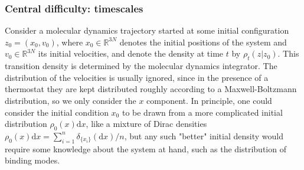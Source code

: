 \documentclass[9pt,bestpractices]{livecoms}
\begin{document}
%
%
%


\subsubsection{Central difficulty: timescales}\label{sec:timescales}

Consider a molecular dynamics trajectory started at some initial configuration $z_0 = (x_0, v_0)$, where $x_0 \in \mathbb{R}^{3 N}$ denotes the initial positions of the system and $v_0 \in \mathbb{R}^{3 N}$ its initial velocities, and denote the density at time $t$ by $\rho_t(z|z_0)$. This transition density is determined by the molecular dynamics integrator. The distribution of the velocities is usually ignored, since in the presence of a thermostat they are kept distributed roughly according to a Maxwell-Boltzmann distribution, so we only consider the $x$ component. In principle, one could consider the initial condition $x_0$ to be drawn from a more complicated initial distribution $\rho_0(x) \mathrm{d}x$, like a mixture of Dirac densities $\rho_0(x) \mathrm{d}x = \sum_{i = 1}^n \delta_{\{ x_i \}}(\mathrm{d}x) / n$, but any such "better" initial density would require some knowledge about the system at hand, such as the distribution of binding modes. 
\end{document}

